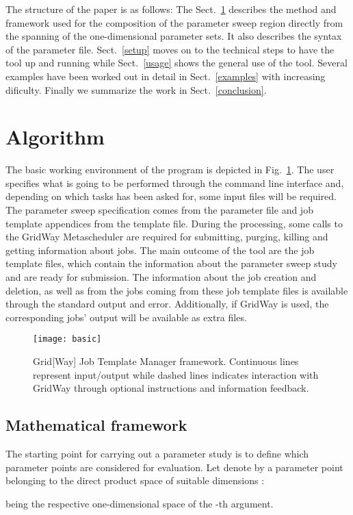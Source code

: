 \documentclass[12pt,a4paper]{article}
\newcommand{\fig}[1]{Fig.~\ref{#1}}
\newcommand{\sect}[1]{Sect.~\ref{#1}}
\begin{document}
The structure of the paper is as follows: The \sect{algorithm} describes the method and framework used for the composition of the parameter sweep region directly from the spanning of the one-dimensional parameter sets. It also describes the syntax of the parameter file. \sect{setup} moves on to the technical steps to have the tool up and running while \sect{usage} shows the general use of the tool. Several examples have been worked out in detail in \sect{examples} with increasing dificulty. Finally we summarize the work in \sect{conclusion}.


\section{Algorithm}\label{algorithm}
The basic working environment of the program is depicted in \fig{basic}. The user specifies what is going to be performed through the command line interface and, depending on which tasks has been asked for, some input files will be required. The parameter sweep specification comes from the parameter file and job template appendices from the template file. During the processing, some calls to the GridWay Metascheduler are required for submitting, purging, killing and getting information about jobs. The main outcome of the tool are the job template files, which contain the information about the parameter sweep study and are ready for submission. The information about the job creation and deletion, as well as from the jobs coming from these job template files is available through the standard output and error. Additionally, if GridWay is used, the corresponding jobs' output will be available as extra files.
\begin{figure}[!ht]
\center
\texttt{[image: basic]}
\caption{Grid[Way] Job Template Manager framework. Continuous lines represent input/output while dashed lines indicates interaction with GridWay through optional instructions and information feedback.}
\label{basic}
\end{figure}

\subsection{Mathematical framework}
The starting point for carrying out a parameter study is to define which parameter points are considered for evaluation. Let denote by  a parameter point belonging to the direct product space of suitable dimensions :

being  the respective one-dimensional space of the -th argument.
\end{document}
